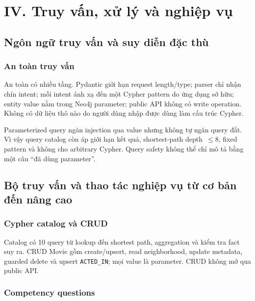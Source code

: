 \chapter{IV. Truy vấn, xử lý và nghiệp vụ}

\section{Ngôn ngữ truy vấn và suy diễn đặc thù}

\subsection{An toàn truy vấn}

An toàn có nhiều tầng. Pydantic giới hạn request length/type; parser chỉ nhận
chín intent; mỗi intent ánh xạ đến một Cypher pattern do ứng dụng sở hữu; entity
value nằm trong Neo4j parameter; public API không có write operation. Không có
dữ liệu thô nào do người dùng nhập được dùng làm cấu trúc Cypher.

Parameterized query ngăn injection qua value nhưng không tự ngăn query đắt. Vì
vậy query catalog còn áp giới hạn kết quả, shortest-path depth~$\leq 8$,
fixed pattern và không
cho arbitrary Cypher. Query safety không thể chỉ mô tả bằng một câu “đã dùng
parameter”.

\section{Bộ truy vấn và thao tác nghiệp vụ từ cơ bản đến nâng cao}

\subsection{Cypher catalog và CRUD}

Catalog có 10 query từ lookup đến shortest path, aggregation và kiểm tra fact suy
ra. CRUD Movie gồm create/upsert, read neighborhood, update metadata, guarded
delete và upsert \texttt{ACTED\_IN}; mọi value là parameter. CRUD không mở qua public API.

\subsection{Competency questions}

